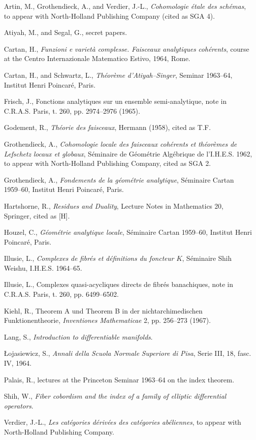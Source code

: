 \begin{enumerate}[label={[\,\arabic*\,]}]
\item Artin, M., Grothendieck, A., and Verdier, J.-L., \emph{Cohomologie étale des schémas}, to appear with North-Holland Publishing Company (cited as SGA 4).
\item Atiyah, M., and Segal, G., secret papers.
\item Cartan, H., \emph{Funzioni e varietà complesse. Faisceaux analytiques cohérents}, course at the Centro Internazionale Matematico Estivo, 1964, Rome.
\item Cartan, H., and Schwartz, L., \emph{Théorème d'Atiyah--Singer}, Seminar 1963--64, Institut Henri Poincaré, Paris.
\item Frisch, J., Fonctions analytiques sur un ensemble semi-analytique, note in C.R.A.S. Paris, t. 260, pp. 2974--2976 (1965).
\item Godement, R., \emph{Théorie des faisceaux}, Hermann (1958), cited as T.F.
\item Grothendieck, A., \emph{Cohomologie locale des faisceaux cohérents et théorèmes de Lefschetz locaux et globaux}, Séminaire de Géométrie Algébrique de l'I.H.E.S. 1962, to appear with North-Holland Publishing Company, cited as SGA 2.
\item Grothendieck, A., \emph{Fondements de la géométrie analytique}, Séminaire Cartan 1959--60, Institut Henri Poincaré, Paris.
\item Hartshorne, R., \emph{Residues and Duality}, Lecture Notes in Mathematics 20, Springer, cited as [H].
\item Houzel, C., \emph{Géométrie analytique locale}, Séminaire Cartan 1959--60, Institut Henri Poincaré, Paris.
\item Illusie, L., \emph{Complexes de fibrés et définitions du foncteur $K$}, Séminaire Shih Weishu, I.H.E.S. 1964--65.
\item Illusie, L., Complexes quasi-acycliques directs de fibrés banachiques, note in C.R.A.S. Paris, t. 260, pp. 6499--6502.
\item Kiehl, R., Theorem A und Theorem B in der nichtarchimedischen Funktionentheorie, \emph{Inventiones Mathematicae} 2, pp. 256--273 (1967).
\item Lang, S., \emph{Introduction to differentiable manifolds}.
\item Łojasiewicz, S., \emph{Annali della Scuola Normale Superiore di Pisa}, Serie III, 18, fasc. IV, 1964.
\item Palais, R., lectures at the Princeton Seminar 1963--64 on the index theorem.
\item Shih, W., \emph{Fiber cobordism and the index of a family of elliptic differential operators}.
\item Verdier, J.-L., \emph{Les catégories dérivées des catégories abéliennes}, to appear with North-Holland Publishing Company.
\end{enumerate}




